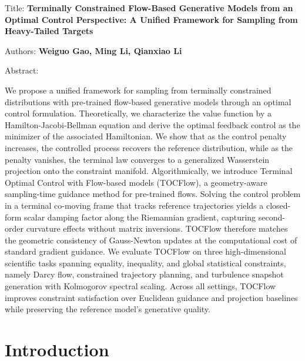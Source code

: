 \documentclass{article}
\begin{document}
        \begin{titlepage}
        \begin{center}
        \Large{Title: \textbf{Terminally Constrained Flow-Based Generative Models from an Optimal Control Perspective: A Unified Framework for Sampling from Heavy-Tailed Targets}}
        \end{center}
        \begin{center}
        \Large{Authors: \textbf{Weiguo Gao, Ming Li, Qianxiao Li}}
        \end{center}
        \begin{center}
        \Large{Abstract:}
        \end{center}
        \begin{center}
        \large{We propose a unified framework for sampling from terminally constrained distributions with pre-trained flow-based generative models through an optimal control formulation. Theoretically, we characterize the value function by a Hamilton-Jacobi-Bellman equation and derive the optimal feedback control as the minimizer of the associated Hamiltonian. We show that as the control penalty increases, the controlled process recovers the reference distribution, while as the penalty vanishes, the terminal law converges to a generalized Wasserstein projection onto the constraint manifold. Algorithmically, we introduce Terminal Optimal Control with Flow-based models (TOCFlow), a geometry-aware sampling-time guidance method for pre-trained flows. Solving the control problem in a terminal co-moving frame that tracks reference trajectories yields a closed-form scalar damping factor along the Riemannian gradient, capturing second-order curvature effects without matrix inversions. TOCFlow therefore matches the geometric consistency of Gauss-Newton updates at the computational cost of standard gradient guidance. We evaluate TOCFlow on three high-dimensional scientific tasks spanning equality, inequality, and global statistical constraints, namely Darcy flow, constrained trajectory planning, and turbulence snapshot generation with Kolmogorov spectral scaling. Across all settings, TOCFlow improves constraint satisfaction over Euclidean guidance and projection baselines while preserving the reference model's generative quality.}
        \end{center}
        \end{titlepage}

        \section{Introduction}
\end{document}
